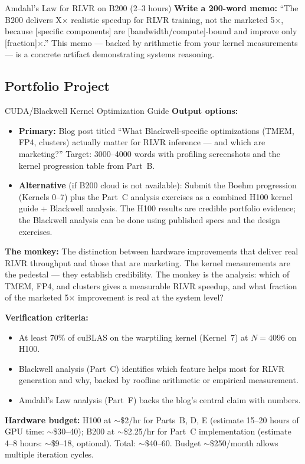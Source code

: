 \begin{exercise}{Amdahl's Law for RLVR on B200 (2--3 hours)}
\textbf{Write a 200-word memo:} ``The B200 delivers X$\times$ realistic speedup for RLVR training, not the marketed 5$\times$, because [specific components] are [bandwidth/compute]-bound and improve only [fraction]$\times$.'' This memo --- backed by arithmetic from your kernel measurements --- is a concrete artifact demonstrating systems reasoning.
\end{exercise}

\subsection{Portfolio Project}

\begin{portfolio}{CUDA/Blackwell Kernel Optimization Guide}
\textbf{Output options:}
\begin{itemize}
  \item \textbf{Primary:} Blog post titled ``What Blackwell-specific optimizations (TMEM, FP4, clusters) actually matter for RLVR inference --- and which are marketing?'' Target: 3000--4000 words with profiling screenshots and the kernel progression table from Part~B.
  \item \textbf{Alternative} (if B200 cloud is not available): Submit the Boehm progression (Kernels 0--7) plus the Part~C analysis exercises as a combined H100 kernel guide + Blackwell analysis. The H100 results are credible portfolio evidence; the Blackwell analysis can be done using published specs and the design exercises.
\end{itemize}

\textbf{The monkey:} The distinction between hardware improvements that deliver real RLVR throughput and those that are marketing. The kernel measurements are the pedestal --- they establish credibility. The monkey is the analysis: which of TMEM, FP4, and clusters gives a measurable RLVR speedup, and what fraction of the marketed 5$\times$ improvement is real at the system level?

\textbf{Verification criteria:}
\begin{itemize}
  \item At least 70\% of cuBLAS on the warptiling kernel (Kernel~7) at $N=4096$ on H100.
  \item Blackwell analysis (Part~C) identifies which feature helps most for RLVR generation and why, backed by roofline arithmetic or empirical measurement.
  \item Amdahl's Law analysis (Part~F) backs the blog's central claim with numbers.
\end{itemize}

\textbf{Hardware budget:} H100 at $\sim$\$2/hr for Parts~B, D, E (estimate 15--20 hours of GPU time: $\sim$\$30--40); B200 at $\sim$\$2.25/hr for Part~C implementation (estimate 4--8 hours: $\sim$\$9--18, optional). Total: $\sim$\$40--60. Budget $\sim$\$250/month allows multiple iteration cycles.
\end{portfolio}

\newpage
